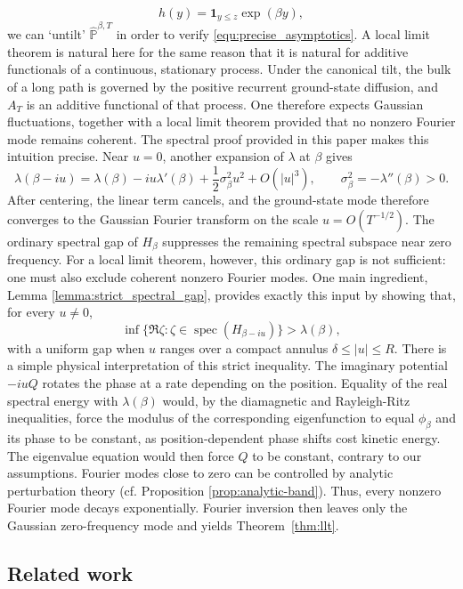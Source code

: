 \documentclass[11pt,reqno]{amsart}
\theoremstyle{definition}
\numberwithin{equation}{section}
\newcommand{\<}{\langle}
\renewcommand{\>}{\rangle}
\def\bbPh{{\hat{\mathbb{P}}}}
\begin{document}
\[h(y) = \mathbf 1_{y \le z }\exp(\beta y),\] 
 we can `untilt' $\bbPh^{\beta,T}$ in order to verify \eqref{equ:precise_asymptotics}. 
A local limit theorem is natural here for the same reason that it is natural
for additive functionals of 
a continuous, stationary
process.  Under the canonical
tilt, the bulk of a long path is governed by the positive recurrent
ground-state diffusion, and $A_T$ is an additive functional of that process.
One therefore expects Gaussian fluctuations, together with a local limit
theorem provided that no nonzero Fourier mode remains coherent.
The spectral proof provided in this paper makes this intuition precise.  Near $u=0$, another expansion of $\lambda$ at $\beta$ gives
\[
  \lambda(\beta-iu)
  =\lambda(\beta)-iu\lambda'(\beta)
     +\frac12\sigma_\beta^2u^2+O(|u|^3),
  \qquad \sigma_\beta^2=-\lambda''(\beta)>0.
\]
After centering, the linear term cancels, and the ground-state mode therefore
converges to the Gaussian Fourier transform on the scale
$u=O(T^{-1/2})$.  The ordinary spectral gap of $H_\beta$ suppresses the
remaining spectral subspace near zero frequency.  For a local limit theorem,
however, this ordinary gap is not sufficient: one must also exclude coherent
nonzero Fourier modes.  One main ingredient, Lemma \ref{lemma:strict_spectral_gap}, provides exactly this input by showing that, for every $u\neq0$,
\[
   \inf\{\Re\zeta:
             \zeta\in\operatorname{spec}(H_{\beta-iu})\}
       >\lambda(\beta),
\]
with a uniform gap when $u$ ranges over a compact annulus
$\delta\leq|u|\leq R$.
There is a simple physical interpretation of this strict inequality.
The imaginary potential $-iuQ$ rotates the phase at a rate depending on the
position.  Equality of the real spectral energy with $\lambda(\beta)$ would,
by the diamagnetic and Rayleigh-Ritz inequalities, force the modulus of the
corresponding eigenfunction to equal $\phi_\beta$ and its phase to be
constant, as position-dependent phase shifts cost kinetic energy.  The eigenvalue equation would then force $Q$ to be constant,
contrary to our assumptions. Fourier modes close to zero can be controlled by analytic perturbation theory (cf. Proposition \ref{prop:analytic-band}).  Thus, every nonzero Fourier mode decays exponentially.  Fourier
inversion then leaves only the
Gaussian zero-frequency mode and yields Theorem~\ref{thm:llt}.


\subsection{Related work}
\end{document}
